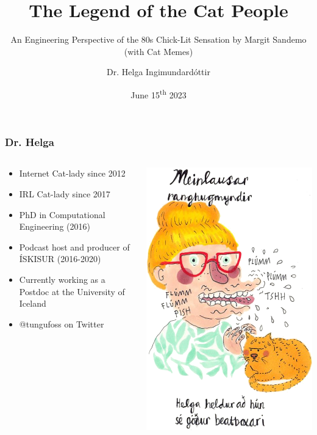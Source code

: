 \documentclass{beamer}
\title{The Legend of the Cat People}
\subtitle{An Engineering Perspective of the 80s Chick-Lit Sensation by Margit Sandemo (with Cat Memes)}
\author{Dr. Helga Ingimundard\'{o}ttir}
\date{June 15\textsuperscript{th} 2023}
\begin{document}
    \frame{\titlepage}

    \begin{frame}
        \frametitle{Dr. Helga}
        \begin{columns}[T]
            \begin{column}{0.55\textwidth}
                \begin{itemize}
                    \item Internet Cat-lady since 2012
                    \item IRL Cat-lady since 2017
                    \item PhD in Computational Engineering (2016)
                    \item Podcast host and producer of \'{I}SKISUR (2016-2020)
                    \item Currently working as a Postdoc at the University of Iceland
                    \item @tungufoss on Twitter
                \end{itemize}
            \end{column}
            \begin{column}{0.45\textwidth}
                \centering
                \includegraphics[width=\textwidth]{figures/helga}

\end{column}
\end{columns}
\end{frame}
\end{document}
